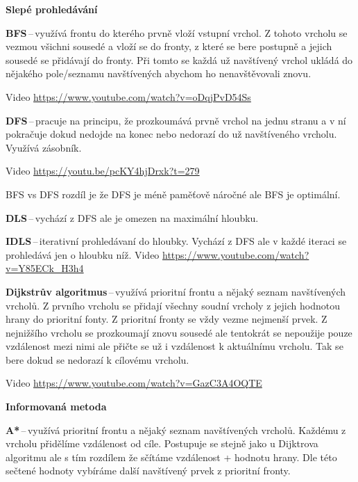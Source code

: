 \begin{Large}\vspace{0,5cm} \textbf{Slepé prohledávání}
\end{Large}

\textbf{BFS}\,--\,využívá frontu do kterého prvně vloží vstupní vrchol. Z tohoto vrcholu se vezmou všichni sousedé a vloží se do fronty, z které se bere postupně a jejich sousedé se přidávají do fronty. Při tomto se každá už navštívený vrchol ukládá do nějakého pole/seznamu navštívených abychom ho nenavštěvovali znovu.

Video \url{https://www.youtube.com/watch?v=oDqjPvD54Ss}

\textbf{DFS}\,--\,pracuje na principu, že prozkoumává prvně vrchol na jednu stranu a v ní pokračuje dokud nedojde na konec nebo nedorazí do už navštíveného vrcholu. Využívá zásobník.

Video \url{https://youtu.be/pcKY4hjDrxk?t=279}

BFS vs DFS rozdíl je že DFS je méně paměťově náročné ale BFS je optimální.

\textbf{DLS}\,--\,vychází z DFS ale je omezen na maximální hloubku.

\textbf{IDLS}\,--\,iterativní prohledávaní do hloubky. Vychází z DFS ale v každé iteraci se prohledává jen o hloubku níž. Video \url{https://www.youtube.com/watch?v=Y85ECk_H3h4}

\textbf{Dijkstrův algoritmus}\,--\,využívá prioritní frontu a nějaký seznam navštívených vrcholů. Z prvního vrcholu se přidají všechny soudní vrcholy z jejich hodnotou hrany do prioritní fonty. Z prioritní fronty se vždy vezme nejmenší prvek. Z nejnižšího vrcholu se prozkoumají znovu sousedé ale tentokrát se nepoužije pouze vzdálenost mezi nimi ale přičte se už i vzdálenost k aktuálnímu vrcholu. Tak se bere dokud se nedorazí k cílovému vrcholu.

Video \url{https://www.youtube.com/watch?v=GazC3A4OQTE}


\begin{Large}\vspace{0,5cm} \textbf{Informovaná metoda}
\end{Large}

\textbf{A*}\,--\,využívá prioritní frontu a nějaký seznam navštívených vrcholů. Každému z vrcholu přidělíme vzdálenost od cíle. Postupuje se stejně jako u Dijktrova algoritmu ale s tím rozdílem že sčítáme vzdálenost + hodnotu hrany. Dle této sečtené hodnoty vybíráme další navštívený prvek z prioritní fronty.

